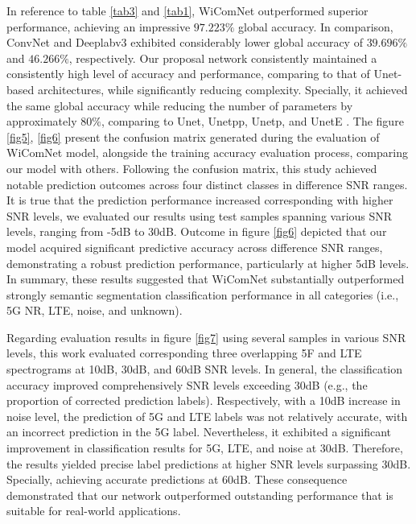 \documentclass[journal]{IEEEtran} %
\begin{document}
In reference to table \ref{tab3} and \ref{tab1}, WiComNet outperformed superior performance, achieving an impressive \(97.223\%\) global accuracy. In comparison, ConvNet and Deeplabv3 exhibited considerably lower global accuracy of \(39.696\%\) and \(46.266\%\), respectively. Our proposal network consistently maintained a consistently high level of accuracy and performance, comparing to that of Unet-based architectures, while significantly reducing complexity. Specially, it achieved the same global accuracy while reducing the number of parameters by approximately \(80\%\), comparing to Unet, Unetpp, Unetp, and UnetE \cite{ronneberger2015u} \cite{zhou2019unet++}. The figure \ref{fig5}, \ref{fig6} present the confusion matrix generated during the evaluation of WiComNet model, alongside the training accuracy evaluation process, comparing our model with others. Following the confusion matrix, this study achieved notable prediction outcomes across four distinct classes in difference SNR ranges. It is true that the prediction performance increased corresponding with higher SNR levels, we evaluated our results using test samples spanning various SNR levels, ranging from -5dB to 30dB. Outcome in figure \ref{fig6} depicted that our model acquired significant predictive accuracy across difference SNR ranges, demonstrating a robust prediction performance, particularly at higher 5dB levels. In summary, these results suggested that WiComNet substantially outperformed strongly semantic segmentation classification performance in all categories (i.e., 5G NR, LTE, noise, and unknown).

Regarding evaluation results in figure \ref{fig7} using several samples in various SNR levels, this work evaluated corresponding three overlapping 5F and LTE spectrograms at 10dB, 30dB, and 60dB SNR levels. In general, the classification accuracy improved comprehensively SNR levels exceeding 30dB (e.g., the proportion of corrected prediction labels). Respectively, with a 10dB increase in noise level, the prediction of 5G and LTE labels was not relatively accurate, with an incorrect prediction in the 5G label. Nevertheless, it exhibited a significant improvement in classification results for 5G, LTE, and noise at 30dB. Therefore, the results yielded precise label predictions at higher SNR levels surpassing 30dB. Specially, achieving accurate predictions at 60dB. These consequence demonstrated that our network outperformed outstanding performance that is suitable for real-world applications.
\end{document}
